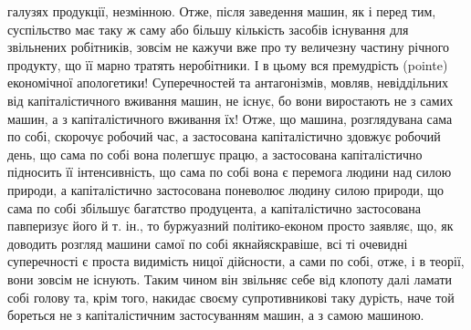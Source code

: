 \parcont{}  %
галузях продукції, незмінною. Отже, після заведення машин,
як і перед тим, суспільство має таку ж саму або більшу кількість
засобів існування для звільнених робітників, зовсім не кажучи
вже про ту величезну частину річного продукту, що її марно
тратять неробітники. І в цьому вся премудрість (pointe) економічної
апологетики! Суперечностей та антагонізмів, мовляв, невіддільних
від капіталістичного вживання машин, не існує, бо
вони виростають не з самих машин, а з капіталістичного вживання
їх! Отже, що машина, розглядувана сама по собі, скорочує
робочий час, а застосована капіталістично здовжує робочий день,
що сама по собі вона полегшує працю, а застосована капіталістично
підносить її інтенсивність, що сама по собі вона є перемога
людини над силою природи, а капіталістично застосована
поневолює людину силою природи, що сама по собі збільшує багатство
продуцента, а капіталістично застосована павперизує
його й т. ін., то буржуазний політико-економ просто заявляє,
що, як доводить розгляд машини самої по собі якнайяскравіше,
всі ті очевидні суперечності є проста видимість ницої дійсности,
а сами по собі, отже, і в теорії, вони зовсім не існують. Таким чином
він звільняє себе від клопоту далі ламати собі голову та,
крім того, накидає своєму супротивникові таку дурість, наче той
бореться не з капіталістичним застосуванням машин, а з самою
машиною.

